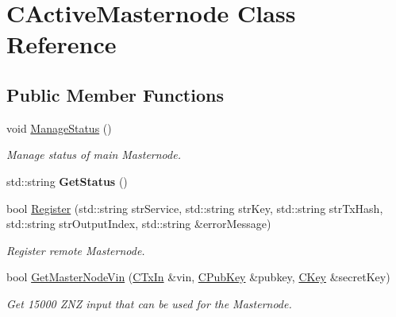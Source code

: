 \hypertarget{class_c_active_masternode}{}\section{C\+Active\+Masternode Class Reference}
\label{class_c_active_masternode}
\subsection*{Public Member Functions}
\begin{DoxyCompactItemize}
\item 
\mbox{\label{class_c_active_masternode_a8004b3b2100da7dcfedbd1e959633e51}} 
void \mbox{\hyperlink{class_c_active_masternode_a8004b3b2100da7dcfedbd1e959633e51}{Manage\+Status}} ()
\begin{DoxyCompactList}\small\item\em Manage status of main Masternode. \end{DoxyCompactList}\item 
\mbox{\label{class_c_active_masternode_a64035096453592380bcb606a75237c60}} 
std\+::string {\bfseries Get\+Status} ()
\item 
\mbox{\label{class_c_active_masternode_a99e26870efec1ea98738cda1a5a85702}} 
bool \mbox{\hyperlink{class_c_active_masternode_a99e26870efec1ea98738cda1a5a85702}{Register}} (std\+::string str\+Service, std\+::string str\+Key, std\+::string str\+Tx\+Hash, std\+::string str\+Output\+Index, std\+::string \&error\+Message)
\begin{DoxyCompactList}\small\item\em Register remote Masternode. \end{DoxyCompactList}\item 
\mbox{\label{class_c_active_masternode_af9f32ec3d13b161d6a89839dab17b154}} 
bool \mbox{\hyperlink{class_c_active_masternode_af9f32ec3d13b161d6a89839dab17b154}{Get\+Master\+Node\+Vin}} (\mbox{\hyperlink{class_c_tx_in}{C\+Tx\+In}} \&vin, \mbox{\hyperlink{class_c_pub_key}{C\+Pub\+Key}} \&pubkey, \mbox{\hyperlink{class_c_key}{C\+Key}} \&secret\+Key)
\begin{DoxyCompactList}\small\item\em Get 15000 Z\+NZ input that can be used for the Masternode. \end{DoxyCompactList}\item 

\end{DoxyCompactItemize}
